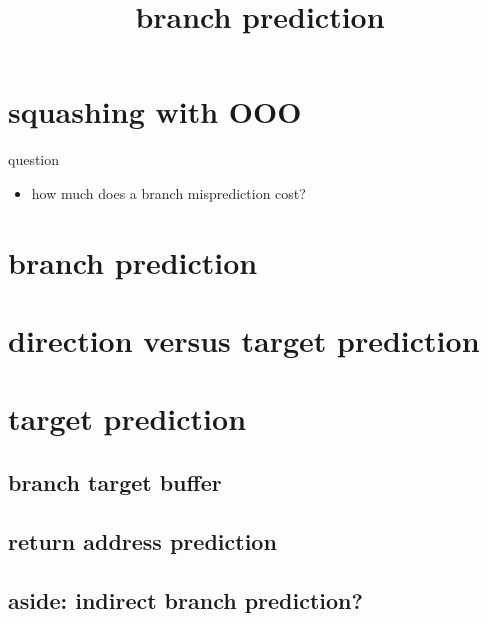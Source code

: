 \title{branch prediction}
\date{}

\begin{frame}
    \titlepage
\end{frame}



\section{squashing with OOO}


\begin{frame}{question}
    \begin{itemize}
    \item how much does a branch misprediction cost?
    \end{itemize}
\end{frame}

\section{branch prediction}

\section{direction versus target prediction}
 

\section{target prediction}

\subsection{branch target buffer}

\subsection{return address prediction}

\subsection{aside: indirect branch prediction?}


